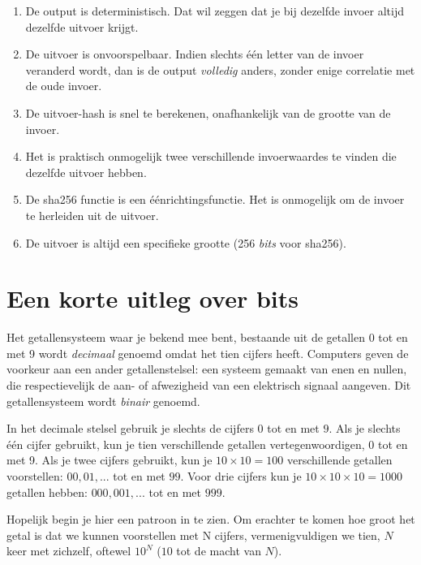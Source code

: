 \documentclass[
  letterpaper,
]{scrbook}
\begin{document}
\begin{enumerate}
\def\labelenumi{\arabic{enumi}.}
\item
  De output is deterministisch. Dat wil zeggen dat je bij dezelfde
  invoer altijd dezelfde uitvoer krijgt.
\item
  De uitvoer is onvoorspelbaar. Indien slechts één letter van de invoer
  veranderd wordt, dan is de output \emph{volledig} anders, zonder enige
  correlatie met de oude invoer.
\item
  De uitvoer-hash is snel te berekenen, onafhankelijk van de grootte van
  de invoer.
\item
  Het is praktisch onmogelijk twee verschillende invoerwaardes te vinden
  die dezelfde uitvoer hebben.
\item
  De sha256 functie is een éénrichtingsfunctie. Het is onmogelijk om de
  invoer te herleiden uit de uitvoer.
\item
  De uitvoer is altijd een specifieke grootte (256 \emph{bits} voor
  sha256).
\end{enumerate}

\hypertarget{een-korte-uitleg-over-bits}{%
\section{Een korte uitleg over bits}\label{een-korte-uitleg-over-bits}}

Het getallensysteem waar je bekend mee bent, bestaande uit de getallen 0
tot en met 9 wordt \emph{decimaal} genoemd omdat het tien cijfers heeft.
Computers geven de voorkeur aan een ander getallenstelsel: een systeem
gemaakt van enen en nullen, die respectievelijk de aan- of afwezigheid
van een elektrisch signaal aangeven. Dit getallensysteem wordt
\emph{binair} genoemd.

In het decimale stelsel gebruik je slechts de cijfers \(0\) tot en met
\(9\). Als je slechts één cijfer gebruikt, kun je tien verschillende
getallen vertegenwoordigen, 0 tot en met 9. Als je twee cijfers
gebruikt, kun je \(10 \times 10 = 100\) verschillende getallen
voorstellen: \(00, 01,...\) tot en met \(99\). Voor drie cijfers kun je
\(10 \times 10 \times 10 = 1000\) getallen hebben: \(000, 001,...\) tot
en met \(999\).

Hopelijk begin je hier een patroon in te zien. Om erachter te komen hoe
groot het getal is dat we kunnen voorstellen met N cijfers,
vermenigvuldigen we tien, \(N\) keer met zichzelf, oftewel \(10^N\)
(\(10\) tot de macht van \(N\)).
\end{document}
